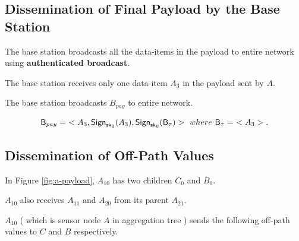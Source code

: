 \documentclass[%
  slidesonly,%
  semlayer%
  ]{seminar}                                  %
\newcommand{\sk}{\sf{sk}}
\begin{document}
\begin{slide}
      \vfill
      \clearpage

    \subsection*{Dissemination of Final Payload by the Base Station}

      The base station broadcasts all the data-items in the payload to entire network using \textbf{authenticated broadcast}.
        
      The base station receives only one data-item $A_{3}$ in the payload sent by $A$.
      
      The base station broadcasts $B_{pay}$ to entire network.

      \begin{equation*}
        \textsf{B}_{pay} =\ <A_{3}, \textsf{Sign}_{\sk_{\textsf{B}}}(A_{3}), \textsf{Sign}_{\sk_{\textsf{B}}}(\textsf{B}_{\tau})>\ where\ \textsf{B}_{\tau} =\ <A_{3}>.
      \end{equation*}
      \vfill
      \clearpage

      \subsection*{Dissemination of Off-Path Values}
        
        In Figure \ref{fig:a-payload}, $A_{10}$ has two children $C_{0}$ and $B_{0}$.
        
        $A_{10}$ also receives $A_{11}$ and $A_{20}$ from its parent $A_{21}$.
        
        $A_{10}$ ( which is sensor node $A$ in aggregation tree ) sends the following off-path values to $C$ and $B$ respectively.
        
        
        

\end{slide}
\end{document}
